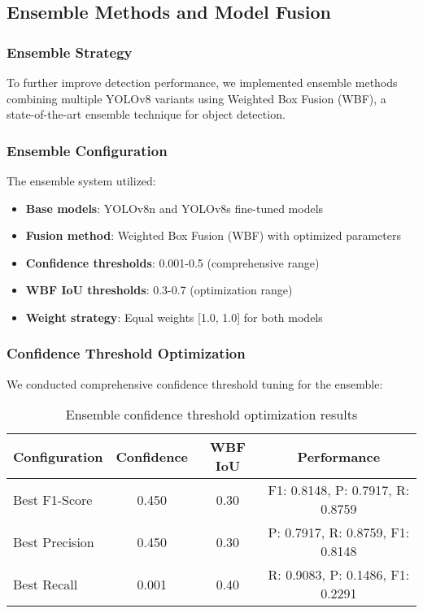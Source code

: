 \documentclass[12pt,a4paper]{article}
\begin{document}
\subsection{Ensemble Methods and Model Fusion}

\subsubsection{Ensemble Strategy}
To further improve detection performance, we implemented ensemble methods combining multiple YOLOv8 variants using Weighted Box Fusion (WBF), a state-of-the-art ensemble technique for object detection.

\subsubsection{Ensemble Configuration}
The ensemble system utilized:
\begin{itemize}
    \item \textbf{Base models}: YOLOv8n and YOLOv8s fine-tuned models
    \item \textbf{Fusion method}: Weighted Box Fusion (WBF) with optimized parameters
    \item \textbf{Confidence thresholds}: 0.001-0.5 (comprehensive range)
    \item \textbf{WBF IoU thresholds}: 0.3-0.7 (optimization range)
    \item \textbf{Weight strategy}: Equal weights [1.0, 1.0] for both models
\end{itemize}

\subsubsection{Confidence Threshold Optimization}
We conducted comprehensive confidence threshold tuning for the ensemble:
\begin{table}[H]
\centering
\begin{tabular}{lccc}
\toprule
\textbf{Configuration} & \textbf{Confidence} & \textbf{WBF IoU} & \textbf{Performance} \\
\midrule
Best F1-Score & 0.450 & 0.30 & F1: 0.8148, P: 0.7917, R: 0.8759 \\
Best Precision & 0.450 & 0.30 & P: 0.7917, R: 0.8759, F1: 0.8148 \\
Best Recall & 0.001 & 0.40 & R: 0.9083, P: 0.1486, F1: 0.2291 \\
\bottomrule
\end{tabular}
\caption{Ensemble confidence threshold optimization results}
\label{tab:ensemble_confidence_optimization}
\end{table}
\end{document}
